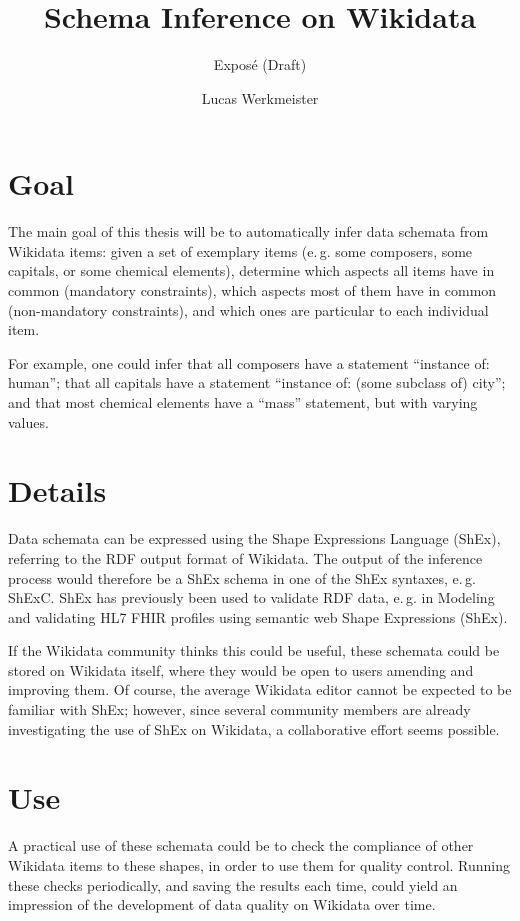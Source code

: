 \documentclass{scrartcl}
\title{Schema Inference on Wikidata}
\subtitle{Exposé (Draft)}
\author{Lucas Werkmeister}
\begin{document}
\maketitle

\section{Goal}

The main goal of this thesis will be to automatically infer data schemata from Wikidata items:
given a set of exemplary items (e.\,g. some composers, some capitals, or some chemical elements),
determine which aspects all items have in common (mandatory constraints),
which aspects most of them have in common (non-mandatory constraints),
and which ones are particular to each individual item.

For example, one could infer that all composers have a statement “instance of: human”;
that all capitals have a statement “instance of: (some subclass of) city”;
and that most chemical elements have a “mass” statement, but with varying values.

\section{Details}

Data schemata can be expressed using the Shape Expressions Language (ShEx),
referring to the RDF output format of Wikidata.
The output of the inference process would therefore be a ShEx schema in one of the ShEx syntaxes, e.\,g. ShExC.
ShEx has previously been used to validate RDF data, e.\,g. in Modeling and validating HL7 FHIR profiles using semantic web Shape Expressions (ShEx).

If the Wikidata community thinks this could be useful, these schemata could be stored on Wikidata itself,
where they would be open to users amending and improving them.
Of course, the average Wikidata editor cannot be expected to be familiar with ShEx;
however, since several community members are already investigating the use of ShEx on Wikidata, a collaborative effort seems possible.

\section{Use}

A practical use of these schemata could be to check the compliance of other Wikidata items to these shapes,
in order to use them for quality control.
Running these checks periodically, and saving the results each time,
could yield an impression of the development of data quality on Wikidata over time.
\end{document}

